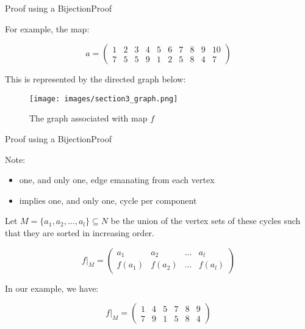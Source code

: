 \documentclass[10pt]{beamer}
\theoremstyle{definition}
\newcommand{\Sthree}{Proof using a Bijection}
\newcommand{\SthreeSSproof}{Proof}
\begin{document}
\begin{frame}{\Sthree}{\SthreeSSproof}

For example, the map:

\[
  a = \left(\begin{matrix}
    1 & 2 & 3 & 4 & 5 & 6 & 7 & 8 & 9 & 10 \\
    7 & 5 & 5 & 9 & 1 & 2 & 5 & 8 & 4 & 7
  \end{matrix}\right)
\]

\pause

This is represented by the directed graph below:

\begin{figure}
  \texttt{[image: images/section3\_graph.png]}
  \caption{The graph associated with map $f$}
  \label{fig:section3_graph}
\end{figure}

\end{frame}

\begin{frame}{\Sthree}{\SthreeSSproof}

Note:
\begin{itemize}
  \item one, and only one, edge emanating from each vertex
  \item implies one, and only one, cycle per component 
\end{itemize}

\pause

Let $M=\{a_{1}, a_{2}, \ldots, a_{l}\} \subseteq N$ be the union of the vertex sets of these cycles such that they are sorted in increasing order.

\[
  f|_{M} = \left(\begin{matrix}
      a_{1}  &   a_{2}  & \ldots &   a_{l} \\
    f(a_{1}) & f(a_{2}) & \ldots & f(a_{l})
  \end{matrix}\right)
\]

In our example, we have:

\[
  f|_{M} = \left(\begin{matrix}
      1 & 4 & 5 & 7 & 8 & 9 \\
      7 & 9 & 1 & 5 & 8 & 4
  \end{matrix}\right)
\]

\end{frame}
\end{document}
